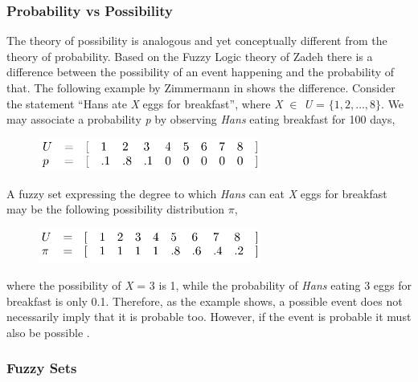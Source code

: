 \documentclass[11pt]{article}
\begin{document}
\subsubsection{Probability vs Possibility}

The theory of possibility is analogous and yet conceptually different from the
theory of probability. Based on the Fuzzy Logic theory of Zadeh
\cite{zadeh:fuzzy} there is a difference between the possibility of an event
happening and the probability of that. The following example by Zimmermann in
\cite{zimmermann:fuzzy-sets} shows the difference. Consider the statement ``Hans
ate \textit{X} eggs for breakfast'', where \textit{X} $\in$ \textit{U} = $\{1,
2, \ldots, 8\}$. We may associate a probability \textit{p} by observing
\textit{Hans} eating breakfast for 100 days,

\begin{figure}[tbh]
  \center
  \includegraphics[width=0.65\textwidth]{figure/prob-poss-01.png}
  \label{fig:probability}
\end{figure}

A fuzzy set expressing the degree to which \textit{Hans} can eat \textit{X} eggs
for breakfast may be the following possibility distribution $\pi$,

\begin{figure}[tbh]
  \center
  \includegraphics[width=0.65\textwidth]{figure/prob-poss-02.png}
  \label{fig:ppssibility}
\end{figure}

where the possibility of \textit{X} = 3 is 1, while the probability of
\textit{Hans} eating 3 eggs for breakfast is only 0.1. Therefore, as the example
shows, a possible event does not necessarily imply that it is probable too.
However, if the event is probable it must also be possible
\cite{zimmermann:fuzzy-sets}.

\subsubsection{Fuzzy Sets}
\end{document}
